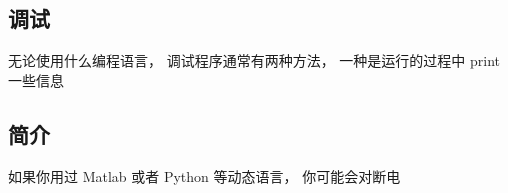 
\subsection{调试}
无论使用什么编程语言， 调试程序通常有两种方法， 一种是运行的过程中 print 一些信息

\subsection{简介}
如果你用过 Matlab 或者 Python 等动态语言， 你可能会对断电
